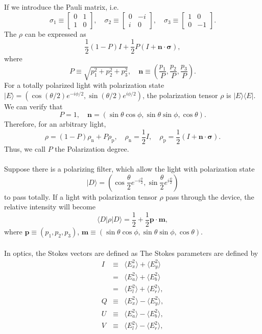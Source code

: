 If we introduce the Pauli matrix, i.e.
\[\sigma_1 \equiv \left[ \begin{matrix} 0& 1\\ 1& 0\end{matrix} \right] , \quad \sigma_2 \equiv \left[ \begin{matrix} 0& - i\\ i& 0\end{matrix} \right] , \quad \sigma_3 \equiv \left[ \begin{matrix} 1& 0\\ 0& -1\end{matrix} \right] .\]
The $\rho$ can be expressed as
\[\frac{1}{2} (1-P) I + \frac{1}{2} P(I + \bm{n} \cdot \bm{\sigma}),\]
where
\[P \equiv \sqrt{p_1^2 + p_2^2 + p_3^2} , \quad \bm{n} \equiv (\frac{p_1}{P},\frac{p_2}{P},\frac{p_3}{P}).\]
For a totally polarized light with polarization state$ | E\rangle = (\cos ({\theta}/{2}) e^{-i{\phi}/{2}} , \sin ({\theta}/{2}) e^{i{\phi}/{2}})$, the polarization tensor $\rho$ is $|E\rangle \langle E|$. We can verify that
\[P = 1 , \quad \bm{n} = (\sin\theta \cos\phi, \sin\theta \sin\phi, \cos \theta).\]
Therefore, for an arbitrary light,
\[\rho = (1-P)\rho_{\mathrm{n}} + P \rho_{\mathrm{p}} , \quad \rho_{\mathrm{n}} = \frac{1}{2}I , \quad \rho_{\mathrm{p}} = \frac{1}{2}(I + \bm{n} \cdot \bm{\sigma}).\]
Thus, we call $P$ the Polarization degree. \\ \\
Suppose there is a polarizing filter,  which allow the light with polarization state
\[| D \rangle = \left(\cos \frac{\theta}{2} e^{-i\frac{\phi}{2}} , \sin \frac{\theta}{2} e^{i\frac{\phi}{2}}\right)\]
to pass totally. If a light with polarization tensor $\rho$ pass through the device, the relative intensity will become
\[\langle D | \rho | D \rangle = \frac{1}{2} + \frac{1}{2} \bm{p} \cdot \bm{m},\]
where $\bm{p} \equiv (p_1,p_2,p_3)$, $\bm{m} \equiv (\sin\theta \cos\phi, \sin\theta \sin\phi, \cos \theta)$.
\\ \\
In optics, the Stokes vectors are defined as
The Stokes parameters are defined by
\begin{eqnarray}
I&\equiv& \langle E_{x}^{2}\rangle +\langle E_{y}^{2}\rangle \nonumber \\
&=& \langle E_{a}^{2}\rangle +\langle E_{b}^{2}\rangle \nonumber \\
&=& \langle E_{l}^{2}\rangle +\langle E_{r}^{2}\rangle, \nonumber \\
Q&\equiv& \langle E_{x}^{2}\rangle -\langle E_{y}^{2}\rangle, \nonumber \\
U&\equiv& \langle E_{a}^{2}\rangle -\langle E_{b}^{2}\rangle, \nonumber \\
V&\equiv& \langle E_{l}^{2}\rangle -\langle E_{r}^{2}\rangle, \nonumber
\end{eqnarray}
